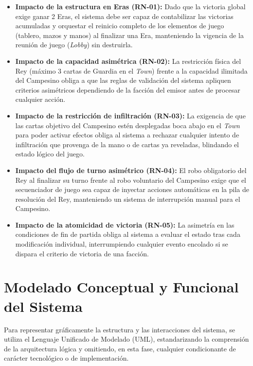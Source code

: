 \begin{itemize}
    \item \textbf{Impacto de la estructura en Eras (RN-01):} Dado que la victoria global exige ganar 2 Eras, el sistema debe ser capaz de contabilizar las victorias acumuladas y orquestar el reinicio completo de los elementos de juego (tablero, mazos y manos) al finalizar una Era, manteniendo la vigencia de la reunión de juego (\textit{Lobby}) sin destruirla.
    
    \item \textbf{Impacto de la capacidad asimétrica (RN-02):} La restricción física del Rey (máximo 3 cartas de Guardia en el \textit{Town}) frente a la capacidad ilimitada del Campesino obliga a que las reglas de validación del sistema apliquen criterios asimétricos dependiendo de la facción del emisor antes de procesar cualquier acción.
    
    \item \textbf{Impacto de la restricción de infiltración (RN-03):} La exigencia de que las cartas objetivo del Campesino estén desplegadas boca abajo en el \textit{Town} para poder activar efectos obliga al sistema a rechazar cualquier intento de infiltración que provenga de la mano o de cartas ya reveladas, blindando el estado lógico del juego.
    
    \item \textbf{Impacto del flujo de turno asimétrico (RN-04):} El robo obligatorio del Rey al finalizar su turno frente al robo voluntario del Campesino exige que el secuenciador de juego sea capaz de inyectar acciones automáticas en la pila de resolución del Rey, manteniendo un sistema de interrupción manual para el Campesino.
    
    \item \textbf{Impacto de la atomicidad de victoria (RN-05):} La asimetría en las condiciones de fin de partida obliga al sistema a evaluar el estado tras cada modificación individual, interrumpiendo cualquier evento encolado si se dispara el criterio de victoria de una facción.
\end{itemize}

\section{Modelado Conceptual y Funcional del Sistema}

Para representar gráficamente la estructura y las interacciones del sistema, se utiliza el Lenguaje Unificado de Modelado (UML), estandarizando la comprensión de la arquitectura lógica y omitiendo, en esta fase, cualquier condicionante de carácter tecnológico o de implementación.

